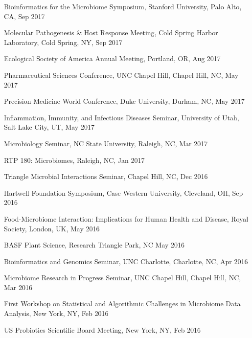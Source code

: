 \documentclass[overlapped,line,11pt]{res}
\begin{document}
\begin{resume}
\begin{revnumerate}[58]
\item {Bioinformatics for the Microbiome Symposium, Stanford University, Palo Alto, CA, Sep 2017}

\item {Molecular Pathogenesis \& Host Response Meeting, Cold Spring Harbor Laboratory, Cold Spring, NY, Sep 2017}

\item {Ecological Society of America Annual Meeting, Portland, OR, Aug 2017}

\item {Pharmaceutical Sciences Conference, UNC Chapel Hill, Chapel Hill, NC, May 2017}

\item {Precision Medicine World Conference, Duke University, Durham, NC, May 2017}

\item {Inflammation, Immunity, and Infectious Diseases Seminar, University of Utah, Salt Lake City, UT, May 2017}

\item {Microbiology Seminar, NC State University, Raleigh, NC, Mar 2017}

\item {RTP 180: Microbiomes, Raleigh, NC, Jan 2017}

\item {Triangle Microbial Interactions Seminar, Chapel Hill, NC, Dec 2016}

\item {Hartwell Foundation Symposium, Case Western University, Cleveland, OH, Sep 2016}

\item {Food-Microbiome Interaction: Implications for Human Health and Disease, Royal Society, London, UK, May 2016}

\item {BASF Plant Science, Research Triangle Park, NC May 2016}

\item {Bioinformatics and Genomics Seminar, UNC Charlotte, Charlotte, NC, Apr 2016}

\item {Microbiome Research in Progress Seminar, UNC Chapel Hill, Chapel Hill, NC, Mar 2016}

\item {First Workshop on Statistical and Algorithmic Challenges in Microbiome Data Analysis, New York, NY, Feb 2016}

\item {US Probiotics Scientific Board Meeting, New York, NY, Feb 2016}


\end{revnumerate}
\end{resume}
\end{document}
